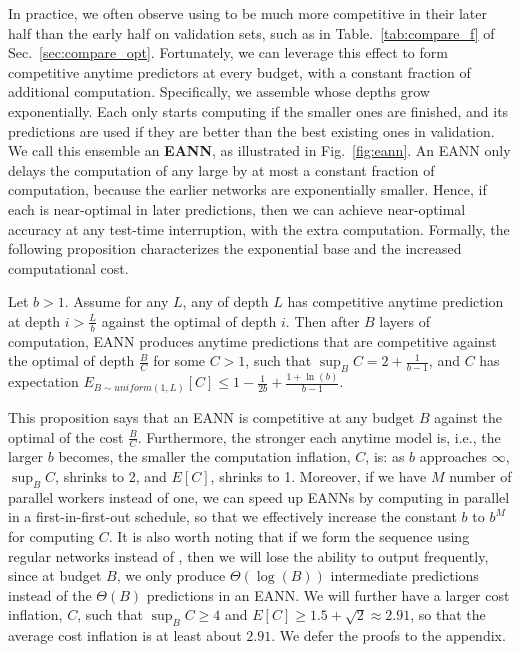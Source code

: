 In practice, we often observe \anns using \adaloss to be much more competitive in their later half than the early half on validation sets, such as in Table.~\ref{tab:compare_f} of Sec.~\ref{sec:compare_opt}. Fortunately, we can leverage this effect to form competitive anytime predictors at every budget, with a constant fraction of additional computation. Specifically, we assemble \anns whose depths grow exponentially. Each \ann only starts computing if the smaller ones are finished, and its predictions are used if they are better than the best existing ones in validation. We call this ensemble an \textbf{EANN}, as illustrated in Fig.~\ref{fig:eann}. An EANN only delays the computation of any large \ann by at most a constant fraction of computation, because the earlier networks are exponentially smaller. Hence, if each \ann is near-optimal in later predictions, then we can achieve near-optimal accuracy at any test-time interruption, with the extra computation. 
Formally, the following proposition characterizes the exponential base and the increased computational cost.  


\begin{proposition}
Let $b>1$. Assume for any $L$, any \ann of depth $L$ has competitive anytime prediction at  depth $i > \frac{L}{b}$ against the optimal of depth $i$. Then after $B$ layers of computation, EANN produces anytime predictions that are competitive against the optimal of depth $\frac{B}{C}$ for some $C > 1$, such that $\sup _B C = 2+ \frac{1}{b-1}$, and $C$ has expectation
$E_{B\sim uniform(1,L)}[C] \leq 1 - \frac{1}{2b} + \frac{1 + \ln (b)}{b-1}$.
\label{prop:eann}
\end{proposition}
This proposition says that an EANN is competitive at any budget $B$ against the optimal of the cost $\frac{B}{C}$. Furthermore, the stronger each anytime model is, i.e., the larger $b$ becomes, the smaller the computation inflation, $C$, is: as $b$ approaches $\infty$, $\sup  _B C$, shrinks to 2, and $E[C]$, shrinks to 1.
Moreover, if we have $M$ number of parallel workers instead of one, we can speed up EANNs by computing \anns in parallel in a first-in-first-out schedule, so that we effectively increase the constant $b$ to $b^M$ for computing $C$. It is also worth noting that if we form the sequence using regular networks instead of \anns, then we will lose the ability to output frequently, since at budget $B$, we only produce $\Theta(\log(B))$ intermediate predictions instead of the $\Theta(B)$ predictions in an EANN. We will further have a larger cost inflation, $C$, such that $\sup  _B C \geq 4$ and $E[C] \geq 1.5 + \sqrt{2} \approx 2.91$, so that the average cost inflation is at least about $2.91$.
We defer the proofs to the appendix.




